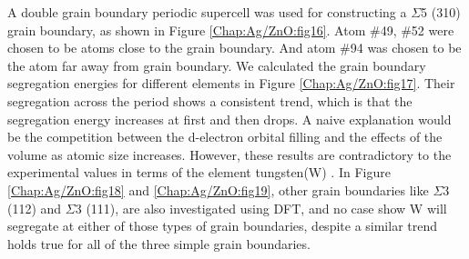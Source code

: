 A double grain boundary periodic supercell was used for constructing a $\Sigma$5 (310) grain boundary, as shown in Figure \ref{Chap:Ag/ZnO:fig16}. Atom \#49, \#52 were chosen to be atoms close to the grain boundary. And atom \#94 was chosen to be the atom far away from grain boundary. We calculated the grain boundary segregation energies for different elements in Figure \ref{Chap:Ag/ZnO:fig17}. Their segregation across the period shows a consistent trend, which is that the segregation energy increases at first and then drops. A naive explanation would be the competition between the d-electron orbital filling and the effects of the volume as atomic size increases. However, these results are contradictory to the experimental values in terms of the element tungsten(W) \cite{chookajorn2012design,jiao2018nanocrystalline}. In Figure \ref{Chap:Ag/ZnO:fig18} and \ref{Chap:Ag/ZnO:fig19}, other grain boundaries like $\Sigma$3 (112) and $\Sigma$3 (111), are also investigated using \ac{DFT}, and no case show W will segregate at either of those types of grain boundaries, despite a similar trend holds true for all of the three simple grain boundaries.


